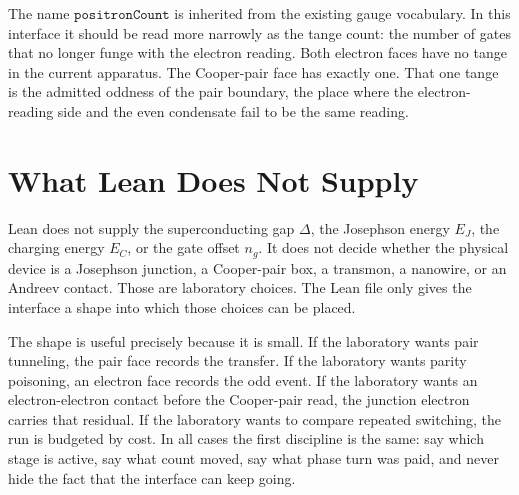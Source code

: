The name \(\texttt{positronCount}\) is inherited from the existing gauge vocabulary. In this interface it should
be read more narrowly as the tange count: the number of gates that no longer funge with the electron reading.
Both electron faces have no tange in the current apparatus. The Cooper-pair face has exactly one. That one tange
is the admitted oddness of the pair boundary, the place where the electron-reading side and the even condensate
fail to be the same reading.

\section{What Lean Does Not Supply}

Lean does not supply the superconducting gap \(\Delta\), the Josephson energy \(E_J\), the charging energy
\(E_C\), or the gate offset \(n_g\). It does not decide whether the physical device is a Josephson junction, a
Cooper-pair box, a transmon, a nanowire, or an Andreev contact. Those are laboratory choices. The Lean file only
gives the interface a shape into which those choices can be placed.

The shape is useful precisely because it is small. If the laboratory wants pair tunneling, the pair face records
the transfer. If the laboratory wants parity poisoning, an electron face records the odd event. If the laboratory
wants an electron-electron contact before the Cooper-pair read, the junction electron carries that residual. If
the laboratory wants to compare repeated switching, the run is budgeted by cost. In all cases the first
discipline is the same: say which stage is active, say what count moved, say what phase turn was paid, and never
hide the fact that the interface can keep going.
